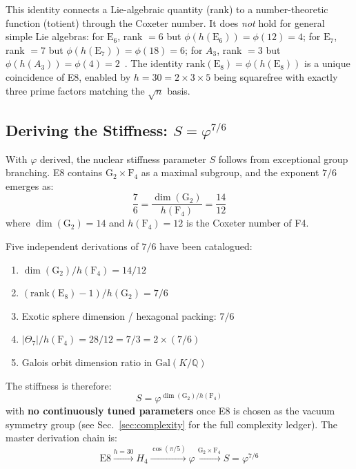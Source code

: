 \documentclass[aps,prd,twocolumn,superscriptaddress,floatfix,nofootinbib]{revtex4-2}
\theoremstyle{definition}
\theoremstyle{remark}
\newcommand{\vp}{\varphi}
\begin{document}
This identity connects a Lie-algebraic quantity (rank) to a number-theoretic
function (totient) through the Coxeter number. It does \emph{not} hold for general
simple Lie algebras: for $\mathrm{E}_6$, rank $= 6$ but $\phi(h(\mathrm{E}_6)) = \phi(12) = 4$;
for $\mathrm{E}_7$, rank $= 7$ but $\phi(h(\mathrm{E}_7)) = \phi(18) = 6$;
for $A_3$, rank $= 3$ but $\phi(h(A_3)) = \phi(4) = 2$~\cite{kostant}. The identity
$\text{rank}(\text{E}_8) = \phi(h(\text{E}_8))$ is a unique coincidence of E8,
enabled by $h = 30 = 2 \times 3 \times 5$ being squarefree with exactly three
prime factors matching the $\sqrt{n}$ basis.

\subsection{Deriving the Stiffness: $S = \vp^{7/6}$}
\label{sec:stiffness-derived}

With $\vp$ derived, the nuclear stiffness parameter $S$ follows from exceptional
group branching. E8 contains $\text{G}_2 \times \text{F}_4$ as a maximal subgroup,
and the exponent $7/6$ emerges as:
\begin{equation}
    \frac{7}{6} = \frac{\dim(\text{G}_2)}{h(\text{F}_4)} = \frac{14}{12}
\end{equation}
where $\dim(\text{G}_2) = 14$ and $h(\text{F}_4) = 12$ is the Coxeter number of F4.

Five independent derivations of $7/6$ have been catalogued:
\begin{enumerate}
    \item $\dim(\text{G}_2)/h(\text{F}_4) = 14/12$ 
    \item $(\text{rank}(\text{E}_8) - 1)/h(\text{G}_2) = 7/6$ 
    \item Exotic sphere dimension / hexagonal packing: $7/6$ 
    \item $|\Theta_7|/h(\text{F}_4) = 28/12 = 7/3 = 2 \times (7/6)$ \quad [PILLAR]
    \item Galois orbit dimension ratio in $\text{Gal}(K/\mathbb{Q})$ \quad [SAND]
\end{enumerate}

\noindent
The stiffness is therefore:
\begin{equation}
    S = \vp^{\dim(\text{G}_2)/h(\text{F}_4)}
\end{equation}
with \textbf{no continuously tuned parameters} once E8 is chosen as the vacuum symmetry group (see Sec.~\ref{sec:complexity} for the full complexity ledger).
The master derivation chain is:
\begin{equation}
    \text{E8} \xrightarrow{h=30} H_4 \xrightarrow{\cos(\pi/5)} \vp
    \xrightarrow{\text{G}_2 \times \text{F}_4} S = \vp^{7/6}
\end{equation}
\end{document}
